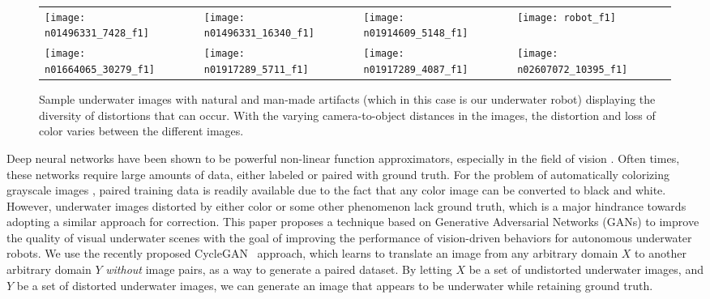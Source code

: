 \begin{figure}
\vspace{2mm}
\centering
\begin{tabular}{p{1.7cm} p{1.7cm} p{1.7cm} p{1.7cm}}
   
   \texttt{[image: n01496331\_7428\_f1]} &
   \texttt{[image: n01496331\_16340\_f1]} &
   \texttt{[image: n01914609\_5148\_f1]} &
   \texttt{[image: robot\_f1]} \\
   \texttt{[image: n01664065\_30279\_f1]} &
   \texttt{[image: n01917289\_5711\_f1]} &
   \texttt{[image: n01917289\_4087\_f1]} &
   \texttt{[image: n02607072\_10395\_f1]} \\
\end{tabular}
\label{fig:samples}
\caption{Sample underwater images with natural and man-made artifacts (which in this case is our underwater robot) displaying the 
diversity of distortions that can occur. With the varying camera-to-object distances in the images, the distortion and loss of 
color varies between the different images.}
\vspace{-5mm}
\end{figure}

Deep neural networks have been shown to be powerful non-linear function approximators, especially in the field of vision 
\cite{krizhevsky2012imagenet}. Often times, these networks require large amounts of data, either labeled or paired with
ground truth. For the problem of automatically colorizing grayscale images \cite{zhang2016colorful}, paired training
data is
readily available due to the fact that any color image can be converted to black and white. However, underwater images distorted 
by either
color or some other phenomenon lack ground truth, which is a major hindrance towards adopting a similar approach for correction. 
This paper proposes a technique based on Generative Adversarial Networks (GANs) to improve the quality of visual underwater scenes 
with the goal of improving the performance of vision-driven behaviors for autonomous underwater robots.
We use the recently proposed CycleGAN~\cite{zhu2017unpaired} approach, which learns to translate an image from any arbitrary 
domain $X$ to another arbitrary domain $Y$ \textit{without} image pairs, as a way to generate a paired dataset.
By letting $X$ be a set of undistorted underwater images, and
$Y$ be a set of distorted underwater images, we can generate an image that appears to be underwater while retaining
ground truth.
